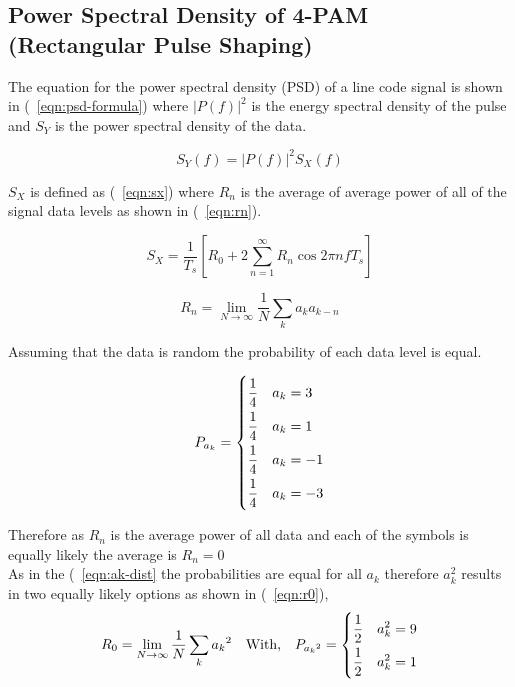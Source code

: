 \subsection{Power Spectral Density of 4-PAM (Rectangular Pulse Shaping)}

The equation for the power spectral density (PSD) of a line code signal is shown in (~\ref{eqn:psd-formula}) where $|P(f)|^2$ is
the energy spectral density of the pulse and $S_Y$ is the power spectral density of the data.

\begin{equation}
    \label{eqn:psd-formula}
    S_Y(f) = |P(f)|^2 S_X(f)
\end{equation}

$S_X$ is defined as (~\ref{eqn:sx}) where $R_n$ is the average of average power of all of the signal data levels as shown in
(~\ref{eqn:rn}).

\begin{equation}
    \label{eqn:sx}
    S_X = \frac{1}{T_s}[R_0 + 2 \sum_{n=1}^{\infty}{R_n \cos 2 \pi n f T_s}]
\end{equation}

\begin{equation}
    \label{eqn:rn}
    R_n=\lim_{N\to\infty} \frac{1}{N} \sum_{k}a_k a_{k-n}
\end{equation}

Assuming that the data is random the probability of each data level is equal.

\begin{equation}
    \label{eqn:ak-dist}
    P_{a_k} = 
    \begin{dcases}
        \frac{1}{4} \quad a_k = 3 \\
        \frac{1}{4} \quad a_k = 1 \\
        \frac{1}{4} \quad a_k = -1 \\
        \frac{1}{4} \quad a_k = -3
    \end{dcases}
\end{equation}

Therefore as $R_n$ is the average power of all data and each of the symbols is equally likely the average is
$R_n=0$ \\

As in the (~\ref{eqn:ak-dist} the probabilities are equal for all $a_k$ therefore $a_k^2$ results in two equally likely 
options as shown in (~\ref{eqn:r0}),
\begin{equation}
    \label{eqn:r0}
    R_0 = \lim_{N\to\infty} \frac{1}{N} \sum_{k} {a_{k}}^2 \quad \textrm{With,} \quad P_{{a_{k}}^2} = 
    \begin{dcases}
        \frac{1}{2} \quad a_k^2 = 9 \\
        \frac{1}{2} \quad a_k^2 = 1
    \end{dcases}
\end{equation}

